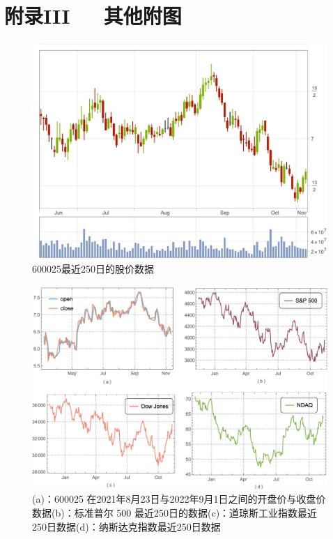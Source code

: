 \documentclass{ctexart}
\newcommand{\0}{\boldsymbol{0}}
\begin{document}
\section*{\kaishu\LARGE\bfseries{附录III~~~其他附图}}

\begin{figure}[ht]
    \centering
    \includegraphics[width=1\textwidth]{stoke.jpeg}
    \caption{\kaishu600025最近250日的股价数据}
    \label{fig:stokes}
\end{figure}

\begin{figure}[ht]
    \centering
    \includegraphics[width=1\textwidth]{sanda.jpeg}
    \caption{\kaishu (a)：600025 在2021年8月23日与2022年9月1日之间的开盘价与收盘价数据\;(b)：标准普尔 500 最近250日的数据\;(c)：道琼斯工业指数最近250日数据\;(d)：纳斯达克指数最近250日数据}
    \label{fig:引用标签}
\end{figure}
\end{document}
